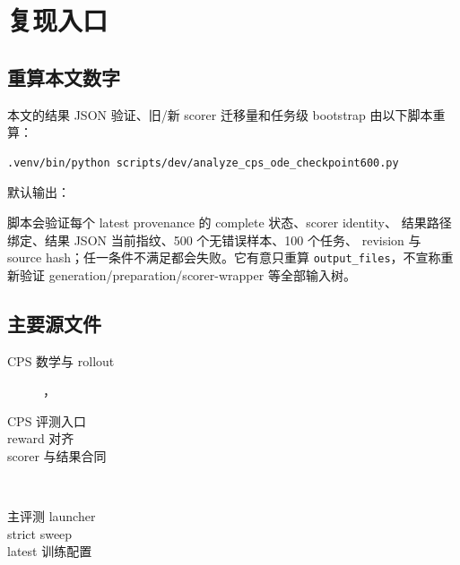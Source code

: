 \documentclass[11pt,a4paper]{article}
\newcommand{\code}[1]{\texttt{#1}}
\begin{document}
\section{复现入口}

\subsection{重算本文数字}

本文的结果 JSON 验证、旧/新 scorer 迁移量和任务级 bootstrap
由以下脚本重算：

\begin{verbatim}
.venv/bin/python scripts/dev/analyze_cps_ode_checkpoint600.py
\end{verbatim}

默认输出：
\begin{center}
\end{center}

脚本会验证每个 latest provenance 的 complete 状态、scorer identity、
结果路径绑定、结果 JSON 当前指纹、500 个无错误样本、100 个任务、
revision 与 source hash；任一条件不满足都会失败。它有意只重算
\code{output\_files}，不宣称重新验证 generation/preparation/scorer-wrapper
等全部输入树。

\subsection{主要源文件}

\begin{description}
  \item[CPS 数学与 rollout]
  ，
  \item[CPS 评测入口]
  \item[reward 对齐]
  \item[scorer 与结果合同]
  \\
  \item[主评测 launcher]
  \item[strict sweep]
  {\footnotesize{}}
  \item[latest 训练配置]
\end{description}
\end{document}
